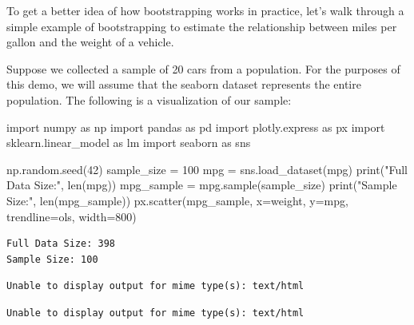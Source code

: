 \documentclass[
  letterpaper,
  DIV=11,
  numbers=noendperiod]{scrreprt}
\newenvironment{Shaded}{\begin{snugshade}}{\end{snugshade}}
\newcommand{\BuiltInTok}[1]{\textcolor[rgb]{0.00,0.23,0.31}{#1}}
\newcommand{\DecValTok}[1]{\textcolor[rgb]{0.68,0.00,0.00}{#1}}
\newcommand{\ImportTok}[1]{\textcolor[rgb]{0.00,0.46,0.62}{#1}}
\newcommand{\NormalTok}[1]{\textcolor[rgb]{0.00,0.23,0.31}{#1}}
\newcommand{\OperatorTok}[1]{\textcolor[rgb]{0.37,0.37,0.37}{#1}}
\newcommand{\StringTok}[1]{\textcolor[rgb]{0.13,0.47,0.30}{#1}}
\begin{document}
To get a better idea of how bootstrapping works in practice, let's walk
through a simple example of bootstrapping to estimate the relationship
between miles per gallon and the weight of a vehicle.

Suppose we collected a sample of 20 cars from a population. For the
purposes of this demo, we will assume that the seaborn dataset
represents the entire population. The following is a visualization of
our sample:

\begin{Shaded}
\begin{Highlighting}[]
\ImportTok{import}\NormalTok{ numpy }\ImportTok{as}\NormalTok{ np}
\ImportTok{import}\NormalTok{ pandas }\ImportTok{as}\NormalTok{ pd}
\ImportTok{import}\NormalTok{ plotly.express }\ImportTok{as}\NormalTok{ px}
\ImportTok{import}\NormalTok{ sklearn.linear\_model }\ImportTok{as}\NormalTok{ lm}
\ImportTok{import}\NormalTok{ seaborn }\ImportTok{as}\NormalTok{ sns}

\NormalTok{np.random.seed(}\DecValTok{42}\NormalTok{)}
\NormalTok{sample\_size }\OperatorTok{=} \DecValTok{100}
\NormalTok{mpg }\OperatorTok{=}\NormalTok{ sns.load\_dataset(}\StringTok{\textquotesingle{}mpg\textquotesingle{}}\NormalTok{)}
\BuiltInTok{print}\NormalTok{(}\StringTok{"Full Data Size:"}\NormalTok{, }\BuiltInTok{len}\NormalTok{(mpg))}
\NormalTok{mpg\_sample }\OperatorTok{=}\NormalTok{ mpg.sample(sample\_size)}
\BuiltInTok{print}\NormalTok{(}\StringTok{"Sample Size:"}\NormalTok{, }\BuiltInTok{len}\NormalTok{(mpg\_sample))}
\NormalTok{px.scatter(mpg\_sample, x}\OperatorTok{=}\StringTok{\textquotesingle{}weight\textquotesingle{}}\NormalTok{, y}\OperatorTok{=}\StringTok{\textquotesingle{}mpg\textquotesingle{}}\NormalTok{, trendline}\OperatorTok{=}\StringTok{\textquotesingle{}ols\textquotesingle{}}\NormalTok{, width}\OperatorTok{=}\DecValTok{800}\NormalTok{)}
\end{Highlighting}
\end{Shaded}

\begin{verbatim}
Full Data Size: 398
Sample Size: 100
\end{verbatim}

\begin{verbatim}
Unable to display output for mime type(s): text/html
\end{verbatim}

\begin{verbatim}
Unable to display output for mime type(s): text/html
\end{verbatim}
\end{document}
